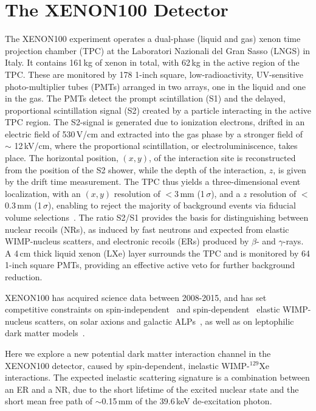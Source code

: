\section{The XENON100 Detector}
\label{sec:xenon100}

The XENON100 experiment operates a dual-phase (liquid and gas) xenon time projection chamber (TPC) at the Laboratori Nazionali 
del Gran Sasso (LNGS) in Italy. It contains 161\,kg of xenon in total,  with  62\,kg in the active region of the TPC. These 
are monitored by 178 1-inch square, low-radioactivity, UV-sensitive photo-multiplier tubes (PMTs) arranged in two arrays, one in the liquid 
and one in the gas. The PMTs detect the prompt scintillation (S1) and the delayed, proportional scintillation signal (S2) 
created by a particle interacting in the active TPC region. The S2-signal is generated due to ionization electrons, drifted 
in an electric field of 530\,V/cm and extracted into the gas phase by a stronger field of $\sim$ 12\,kV/cm, where the proportional scintillation, or electroluminiscence, 
takes place.
The horizontal position, $(x,y)$, of the interaction site is reconstructed from the position of the S2 shower, while the depth of the interaction, $z$, is given by the drift time measurement.
The TPC thus yields a three-dimensional event localization, with an $(x,y)$ resolution of $<$3\,mm (1\,$\sigma$), and a $z$ resolution of  $<$0.3\,mm (1\,$\sigma$), enabling to reject the majority of background events via fiducial volume selections~\cite{Aprile:2011dd}. The ratio S2/S1 provides the basis for distinguishing between nuclear recoils (NRs), as induced by fast neutrons and expected from elastic WIMP-nucleus scatters, and electronic recoils (ERs) produced by $\beta$- and $\gamma$-rays.  A 4\,cm thick liquid xenon (LXe) layer surrounds the TPC and is monitored by 64 1-inch square PMTs, providing an effective active veto for further background reduction.

XENON100 has acquired science data between 2008-2015, and has set competitive constraints on spin-independent~\cite{Aprile:2012nq,Aprile:2016swn} 
and spin-dependent~\cite{Aprile:2013doa,Aprile:2016swn} elastic WIMP-nucleus 
scatters, on solar axions and galactic ALPs~\cite{Aprile:2014eoa}, as well as on leptophilic dark matter models~\cite{Aprile:2015ade,Aprile:2015ibr,Aprile:2017yea}. 

Here we explore a new potential dark matter interaction channel in the XENON100 detector, caused by spin-dependent, inelastic WIMP-$^{129}$Xe interactions. The expected inelastic scattering signature is a combination between an ER and a NR, due to the short lifetime of the excited nuclear state and  the short mean free path of $\sim$0.15\,mm of the 39.6\,keV de-excitation photon. 


